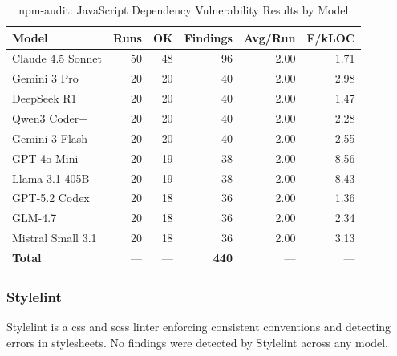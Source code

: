 \begin{table}[htbp]
    \centering
    \caption{npm-audit: JavaScript Dependency Vulnerability Results by Model}
    \label{tab:tool_npmaudit}
    \small
    \begin{tabular}{@{} l r r r r r @{}}
        \toprule
        \textbf{Model} & \textbf{Runs} & \textbf{OK} & \textbf{Findings} & \textbf{Avg/Run} & \textbf{F/kLOC} \\
        \midrule
        Claude 4.5 Sonnet & 50 & 48 & 96 & 2.00 & 1.71 \\
        Gemini 3 Pro & 20 & 20 & 40 & 2.00 & 2.98 \\
        DeepSeek R1 & 20 & 20 & 40 & 2.00 & 1.47 \\
        Qwen3 Coder+ & 20 & 20 & 40 & 2.00 & 2.28 \\
        Gemini 3 Flash & 20 & 20 & 40 & 2.00 & 2.55 \\
        GPT-4o Mini & 20 & 19 & 38 & 2.00 & 8.56 \\
        Llama 3.1 405B & 20 & 19 & 38 & 2.00 & 8.43 \\
        GPT-5.2 Codex & 20 & 18 & 36 & 2.00 & 1.36 \\
        GLM-4.7 & 20 & 18 & 36 & 2.00 & 2.34 \\
        Mistral Small 3.1 & 20 & 18 & 36 & 2.00 & 3.13 \\
        \midrule
        \textbf{Total} & --- & --- & \textbf{440} & --- & --- \\
        \bottomrule
    \end{tabular}
\end{table}

\subsubsection{Stylelint}

Stylelint is a css and scss linter enforcing consistent conventions and detecting errors in stylesheets.
 No findings were detected by Stylelint across any model.


